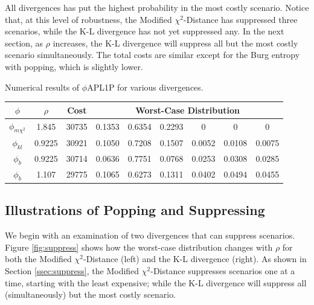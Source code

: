 \documentclass[ijoc,letterpaper]{informs3} %
\begin{document}
All divergences has put the highest probability in the most costly scenario. 
Notice that, at this level of robustness, the Modified $\chi^2$-Distance has suppressed three scenarios, while the K-L divergence has not yet suppressed any.
In the next section, as $\rho$ increases, the K-L divergence will suppress all but the most costly scenario simultaneously. 
The total costs are similar except for the Burg entropy with popping, which is slightly lower.


\begin{table}
	\TABLE
	{
		Numerical results of $\phi$APL1P for various divergences.
		\label{tb:numerical_results}
	}
	{\begin{tabular}{cc|c|cccccc}
		$\phi$ & $\rho$ & Cost & \multicolumn{6}{c}{Worst-Case Distribution} \\
		\hline
		$\phi_{m\chi^2}$ &  1.845  & 30735 & 0.1353 & 0.6354 & 0.2293 & 0      & 0      & 0 \\
		$\phi_{kl}$      &  0.9225 & 30921 & 0.1050 & 0.7208 & 0.1507 & 0.0052 & 0.0108 & 0.0075 \\
		$\phi_b$         &  0.9225 & 30714 & 0.0636 & 0.7751 & 0.0768 & 0.0253 & 0.0308 & 0.0285 \\
		\hline
		$\phi_b$         &  1.107  & 29775 & 0.1065 & 0.6273 & 0.1311 & 0.0402 & 0.0494 & 0.0455
	\end{tabular}}
	{}
\end{table}

\subsection{Illustrations of Popping and Suppressing}
\label{ssec:numerical_pop_suppress}



We begin with an examination of two divergences that can suppress scenarios.
Figure \ref{fig:suppress} shows how the worst-case distribution changes with $\rho$ for both the Modified $\chi^2$-Distance (left) and the K-L divergence (right).
As shown in Section \ref{ssec:suppress}, the Modified $\chi^2$-Distance suppresses scenarios one at a time, starting with the least expensive; while the K-L divergence will suppress all (simultaneously) but the most costly scenario.
\end{document}
